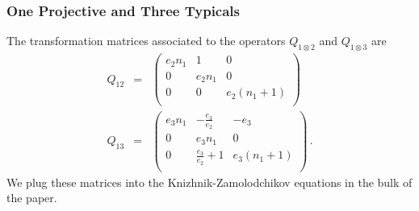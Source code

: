 \documentclass[12pt]{article}
\numberwithin{equation}{section}
\numberwithin{equation}{section}
\numberwithin{table}{section}\setlength{\multlinegap}{25pt}
\begin{document}
\subsubsection{One Projective and Three Typicals}
The transformation matrices associated to the operators $Q_{1 \otimes 2}$ and $Q_{1 \otimes 3}$ are
\begin{eqnarray}
Q_{12} &=& \left(
\begin{array}{ccc}
 e_2 n_1 & 1 & 0 \\
 0 & e_2 n_1 & 0 \\
 0 & 0 & e_2 \left(n_1+1\right) \\
\end{array}
\right)
\nonumber \\
Q_{13} &=& \left(
\begin{array}{ccc}
 e_3 n_1 & -\frac{e_3}{e_2} & -e_3 \\
 0 & e_3 n_1 & 0 \\
 0 & \frac{e_3}{e_2}+1 & e_3 \left(n_1+1\right) \\
\end{array}
\right)\, .
\label{threechannelsQ}
\end{eqnarray}
We plug these matrices into the Knizhnik-Zamolodchikov equations in the bulk of the paper.
\end{document}
